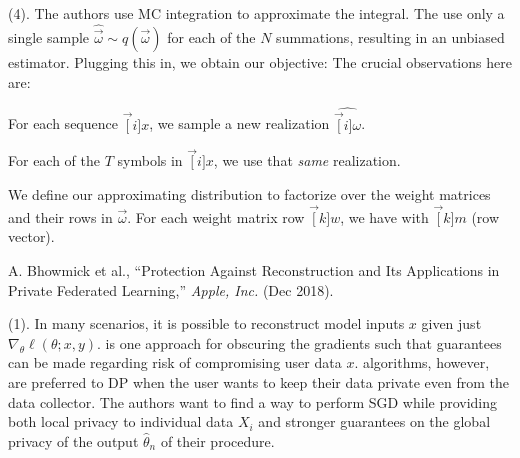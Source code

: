 \documentclass[11pt]{article}
\begin{document}
\myspace
\p {} (4). The authors use MC integration to approximate the integral. The use only a single sample $\hat{\vec \omega} \sim q(\vec \omega)$ for each of the $N$ summations, resulting in an unbiased estimator. Plugging this in, we obtain our objective:
The crucial observations here are:
\begin{compactitem}
	\item For each sequence $\vec[i]{x}$, we sample a new realization $\hat{\vec[i]{\omega}}$. 
	\item For each of the $T$ symbols in $\vec[i]{x}$, we use that \textit{same} realization. 
\end{compactitem}
We define our approximating distribution to factorize over the weight matrices and their rows in $\vec\omega$. For each weight matrix row $\vec[k]{w}$, we have
with $\vec[k]{m}$  (row vector). 








\vspace{-1em}
{\footnotesize A. Bhowmick et al., ``Protection Against Reconstruction and Its Applications in Private Federated Learning,'' \textit{Apple, Inc.} (Dec 2018).}


\p {} (1). In many scenarios, it is possible to reconstruct model inputs $x$ given just $\nabla_{\theta} \ell (\theta; x, y)$.  is one approach for obscuring the gradients such that guarantees can be made regarding risk of compromising user data $x$.  algorithms, however, are preferred to DP when the user wants to keep their data private even from the data collector. The authors want to find a way to perform SGD while providing both local privacy to individual data $X_i$ and stronger guarantees on the global privacy of the output $\hat \theta_n$ of their procedure. \\
\end{document}
